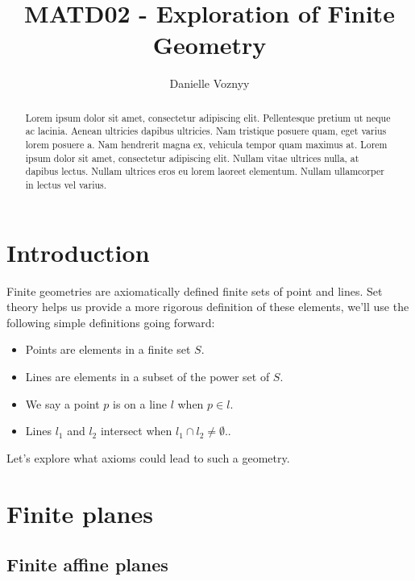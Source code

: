 \documentclass[12pt]{article}
\title{MATD02 - Exploration of Finite Geometry }
\author{Danielle Voznyy}
\date{}
\begin{document}
    \maketitle

    \begin{abstract}
        Lorem ipsum dolor sit amet, consectetur adipiscing elit.
        Pellentesque pretium ut neque ac lacinia.
        Aenean ultricies dapibus ultricies.
        Nam tristique posuere quam, eget varius lorem posuere a.
        Nam hendrerit magna ex, vehicula tempor quam maximus at.
        Lorem ipsum dolor sit amet, consectetur adipiscing elit.
        Nullam vitae ultrices nulla, at dapibus lectus.
        Nullam ultrices eros eu lorem laoreet elementum.
        Nullam ullamcorper in lectus vel varius.
    \end{abstract}


    \section{Introduction}

    Finite geometries are axiomatically defined finite sets of point and lines.
    Set theory helps us provide a more rigorous definition of these elements,
    we'll use the following simple definitions going forward:

    \begin{itemize}
        \setlength\itemsep{0em}
        \item Points are elements in a finite set \( S \).
        \item Lines are elements in a subset of the power set of \( S \).
        \item We say a point \( p \) is on a line \( l \) when \( p \in l \).
        \item Lines \( l_1 \) and \( l_2 \) intersect when \( l_1 \cap l_2 \neq \emptyset \)..
    \end{itemize}

    Let's explore what axioms could lead to such a geometry.


    \section{Finite planes}

    \subsection{Finite affine planes}
\end{document}

